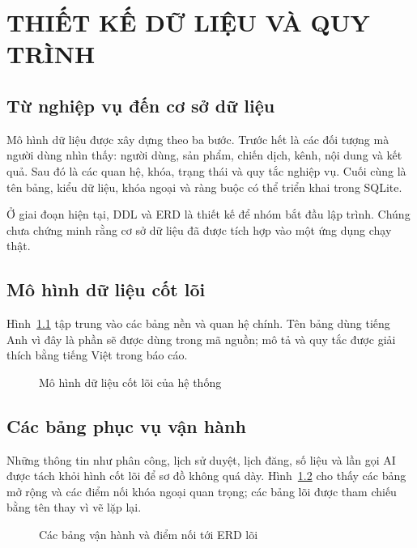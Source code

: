 \chapter{THIẾT KẾ DỮ LIỆU VÀ QUY TRÌNH}

\section{Từ nghiệp vụ đến cơ sở dữ liệu}

Mô hình dữ liệu được xây dựng theo ba bước. Trước hết là các đối tượng mà người dùng nhìn thấy: người dùng, sản phẩm, chiến dịch, kênh, nội dung và kết quả. Sau đó là các quan hệ, khóa, trạng thái và quy tắc nghiệp vụ. Cuối cùng là tên bảng, kiểu dữ liệu, khóa ngoại và ràng buộc có thể triển khai trong SQLite.

Ở giai đoạn hiện tại, DDL và ERD là thiết kế để nhóm bắt đầu lập trình. Chúng chưa chứng minh rằng cơ sở dữ liệu đã được tích hợp vào một ứng dụng chạy thật.

\section{Mô hình dữ liệu cốt lõi}

Hình~\ref{fig:v8-erd-core} tập trung vào các bảng nền và quan hệ chính. Tên bảng dùng tiếng Anh vì đây là phần sẽ được dùng trong mã nguồn; mô tả và quy tắc được giải thích bằng tiếng Việt trong báo cáo.

\begin{figure}[h!]
\centering

\caption{Mô hình dữ liệu cốt lõi của hệ thống}
\label{fig:v8-erd-core}
\end{figure}

\clearpage
\section{Các bảng phục vụ vận hành}

Những thông tin như phân công, lịch sử duyệt, lịch đăng, số liệu và lần gọi AI được tách khỏi hình cốt lõi để sơ đồ không quá dày. Hình~\ref{fig:v8-erd-ops} cho thấy các bảng mở rộng và các điểm nối khóa ngoại quan trọng; các bảng lõi được tham chiếu bằng tên thay vì vẽ lặp lại.

\begin{figure}[h!]
\centering

\caption{Các bảng vận hành và điểm nối tới ERD lõi}
\label{fig:v8-erd-ops}
\end{figure}

